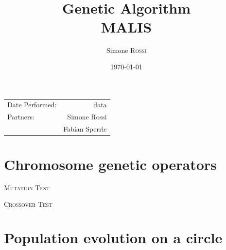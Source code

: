\documentclass{article}
\title{Genetic Algorithm\\MALIS} %
\author{Simone \textsc{Rossi}} %
\date{\today} %
\begin{document}
\maketitle %

\begin{center}
\begin{tabular}{l r}
Date Performed: & data \\ %
Partners: & Simone Rossi \\ %
          & Fabian Sperrle\\
\end{tabular}
\end{center}



\section{Chromosome genetic operators}

\textsc{Mutation Test}

\newpage
\textsc{Crossover Test}


\section{Population evolution on a circle}

\end{document}
